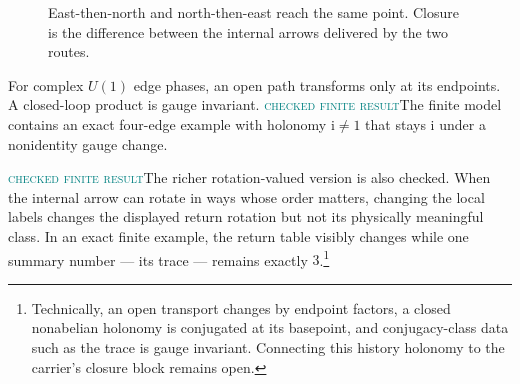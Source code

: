\documentclass[11pt]{article}
\newcommand{\ii}{\mathrm{i}}
\newcommand{\Mlabel}{\textcolor{teal}{\textsc{checked finite result}}}
\begin{document}
\begin{figure}[ht]
\centering
{}
\caption{East-then-north and north-then-east reach the same point.  Closure is
the difference between the internal arrows delivered by the two routes.}
\label{fig:closure}
\end{figure}

For complex $U(1)$ edge phases, an open path transforms only at its endpoints.
A closed-loop product is gauge invariant.  \Mlabel\quad The finite model
contains an exact
four-edge example with holonomy $\ii\ne1$ that stays $\ii$ under a nonidentity
gauge change.

\Mlabel\quad The richer rotation-valued version is also checked.  When the
internal arrow can rotate in ways whose order matters, changing the local
labels changes the displayed return rotation but not its physically meaningful
class.  In an exact finite example, the return table visibly changes while one
summary number --- its trace --- remains exactly $3$.\footnote{Technically, an
open transport changes by endpoint factors, a closed nonabelian holonomy is
conjugated at its basepoint, and conjugacy-class data such as the trace is gauge
invariant.  Connecting this history holonomy to the carrier's closure block
remains open.}
\end{document}
